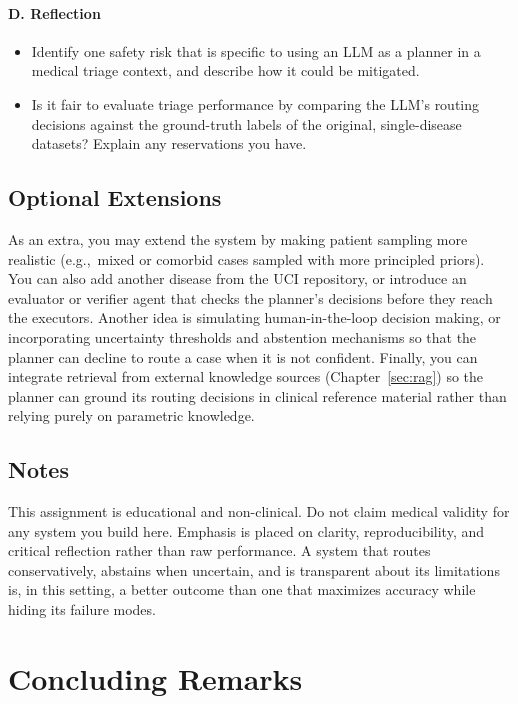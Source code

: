 \paragraph{D. Reflection}
\begin{itemize}
    \item Identify one safety risk that is specific to using an LLM as a planner in a medical triage context, and describe how it could be mitigated.
    \item Is it fair to evaluate triage performance by comparing the LLM's routing decisions against the ground-truth labels of the original, single-disease datasets? Explain any reservations you have.
\end{itemize}


\subsection*{Optional Extensions}

As an extra, you may extend the system by making patient sampling more realistic (e.g.,\ mixed or comorbid cases sampled with more principled priors). You can also add another disease from the UCI repository, or introduce an evaluator or verifier agent that checks the planner's decisions before they reach the executors. Another idea is simulating human-in-the-loop decision making, or incorporating uncertainty thresholds and abstention mechanisms so that the planner can decline to route a case when it is not confident. Finally, you can integrate retrieval from external knowledge sources (Chapter~\ref{sec:rag}) so the planner can ground its routing decisions in clinical reference material rather than relying purely on parametric knowledge.


\subsection*{Notes}

This assignment is educational and non-clinical. Do not claim medical validity for any system you build here. Emphasis is placed on clarity, reproducibility, and critical reflection rather than raw performance. A system that routes conservatively, abstains when uncertain, and is transparent about its limitations is, in this setting, a better outcome than one that maximizes accuracy while hiding its failure modes.


\section{Concluding Remarks}

